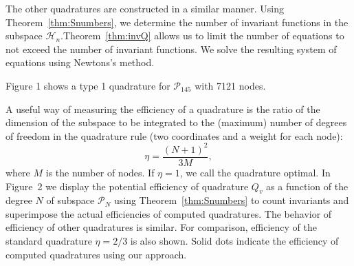 \documentclass[landscape,a0b,final]{a0poster}
\newcommand{\Har}{{\mathcal H}}
\newcommand{\HH}{{\mathcal P}}
\newenvironment{poster}{
  \begin{center}
  \begin{minipage}[c]{0.98\textwidth}
}{
  \end{minipage} 
  \end{center}
}
\newcommand{\myfig}[3][0]{
\begin{center}
  \vspace{1.25cm}
  \texttt{[image: \#2]}
  \nobreak\medskip
\end{center}}
\newcommand{\mycaption}[1]{
  \vspace{0.25cm}
  \begin{quote}
    {{\sc Figure} \arabic{figure}: #1}
  \end{quote}
  \vspace{0.25cm}
  \stepcounter{figure}
}
\begin{document}
\begin{poster}
\begin{multicols}{3}
The other quadratures are constructed in a similar manner. Using Theorem~\ref{thm:Snumbers}, we determine the number of invariant functions in the subspace $\Har_{n}$.Theorem~\ref{thm:invQ} allows us to limit the number of equations to not exceed the number of invariant functions. We solve the resulting system of equations using Newtons's method.

Figure 1 shows a type 1 quadrature for $\HH_{145}$ with 7121 nodes.
%




%
A useful way of measuring the efficiency of a quadrature is the ratio of the dimension of the subspace
to be integrated to the (maximum) number of degrees of freedom in
the quadrature rule (two coordinates and a weight for each node):
%
\begin{equation}
\eta=\frac{\left(N+1\right)^{2}}{3M},\label{eq:efficiency}
\end{equation}
%
where $M$ is the number of nodes. If $\eta=1$, we call the quadrature optimal.
%
%
In Figure~2 we display the
potential efficiency of quadrature $Q_{v}$ as a function of the degree
$N$ of subspace $\HH_{N}$ using Theorem~\ref{thm:Snumbers} to count invariants and superimpose the
actual efficiencies of computed quadratures. The behavior of efficiency
of other quadratures is similar. For comparison, efficiency of the standard quadrature $\eta=2/3$
is also shown. Solid dots indicate the efficiency of computed quadratures
using our approach.




\end{multicols}
\end{poster}
\end{document}
